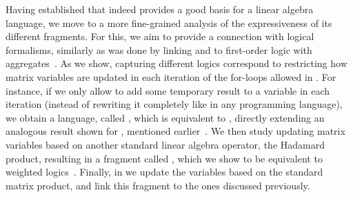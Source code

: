 Having established that \langfor indeed provides a good basis for a linear algebra language, we move to a more fine-grained analysis of the expressiveness of its different fragments. For this, we aim to provide a connection with logical formalisms, similarly as was done by linking \lara and \lang to first-order logic with aggregates~\cite{BarceloH0S20,matlang-journal}. As we show, capturing different logics correspond to restricting how matrix variables are updated in each iteration of the for-loops allowed in \langfor. For instance, if we only allow to add some temporary result to a variable in each iteration (instead of rewriting it completely like in any programming language), we obtain a language, called \langsum, which is equivalent to \rak, directly extending an analogous result shown for \lang, mentioned earlier~\cite{brijder2019matrices}. We then study updating matrix variables based on another standard linear algebra operator, the Hadamard product, resulting in a fragment called \langprod, which we show to be equivalent to weighted logics~\cite{DrosteG05}. Finally, in \langmprod 
we 
update the variables based on the standard matrix product, and link this fragment 
to the ones discussed previously.  


